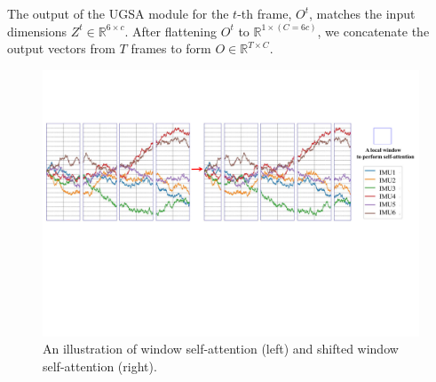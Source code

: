 \documentclass[letterpaper]{article} %
\begin{document}
The output of the UGSA module for the \(t\)-th frame, \({O}^{t}\), matches the input dimensions \({Z}^{t} \in \mathbb{R}^{6\times c}\). After flattening \({O}^{t}\) to \(\mathbb{R}^{1\times (C=6c)}\), we concatenate the output vectors from \(T\) frames to form \({O} \in \mathbb{R}^{T\times C}\).
\begin{figure}[t]
\centering
\includegraphics[width=\columnwidth]{window_partition.pdf}
\caption{An illustration of window self-attention (left) and shifted window self-attention (right).}
\label{fig3}
\end{figure}
\end{document}
